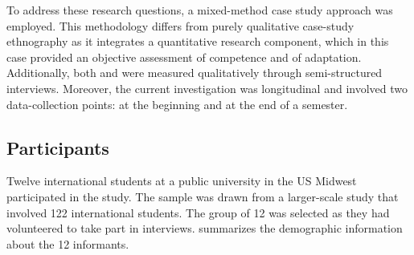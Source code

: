 \documentclass[output=paper]{langsci/langscibook}
\begin{document}
To address these research questions, a mixed-method case study approach was employed. This methodology differs from purely qualitative case-study ethnography as it integrates a quantitative research component, which in this case provided an objective assessment of  competence and of  adaptation. Additionally, both  and  were measured qualitatively through semi-structured interviews. Moreover, the current investigation was longitudinal and involved two data-collection points: at the beginning and at the end of a semester.


\subsection{Participants}


Twelve international students at a public university in the US Midwest participated in the study. The sample was drawn from a larger-scale study that involved 122 international students. The group of 12 was selected as they had volunteered to take part in interviews.  summarizes the demographic information about the 12 informants.
\end{document}
